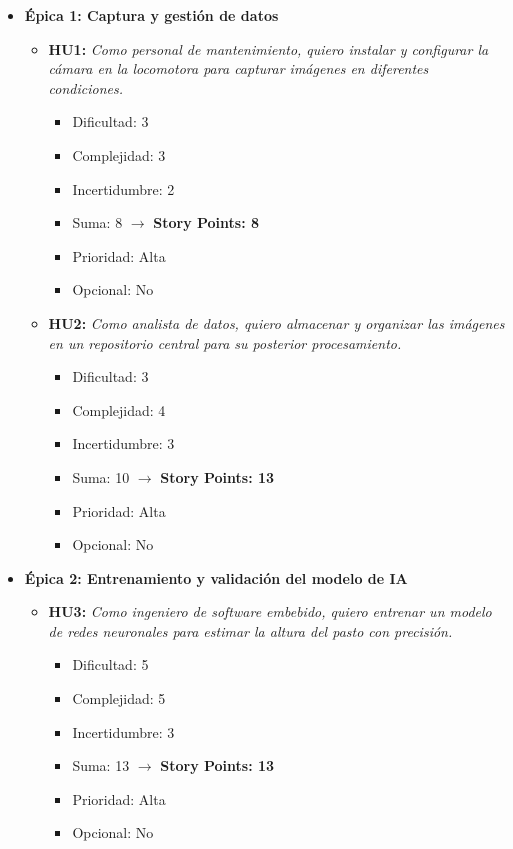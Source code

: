 \documentclass[
11pt, %
]{ProyectoVpC}
\begin{document}
\begin{itemize}
  \item \textbf{\'{E}pica 1: Captura y gestión de datos}
    \begin{itemize}
      \item \textbf{HU1:} 
      \emph{Como personal de mantenimiento, quiero instalar y configurar la cámara en la locomotora para capturar imágenes en diferentes condiciones.}
        \begin{itemize}[label=$\cdot$]
          \item Dificultad: 3
          \item Complejidad: 3
          \item Incertidumbre: 2
          \item Suma: 8 $\rightarrow$ \textbf{Story Points: 8}
          \item Prioridad: Alta
          \item Opcional: No
        \end{itemize}

      \item \textbf{HU2:} 
      \emph{Como analista de datos, quiero almacenar y organizar las imágenes en un repositorio central para su posterior procesamiento.}
        \begin{itemize}[label=$\cdot$]
          \item Dificultad: 3
          \item Complejidad: 4
          \item Incertidumbre: 3
          \item Suma: 10 $\rightarrow$ \textbf{Story Points: 13}
          \item Prioridad: Alta
          \item Opcional: No
        \end{itemize}
    \end{itemize}

  \item \textbf{\'{E}pica 2: Entrenamiento y validación del modelo de IA}
    \begin{itemize}
      \item \textbf{HU3:}
      \emph{Como ingeniero de software embebido, quiero entrenar un modelo de redes neuronales para estimar la altura del pasto con precisión.}
        \begin{itemize}[label=$\cdot$]
          \item Dificultad: 5
          \item Complejidad: 5
          \item Incertidumbre: 3
          \item Suma: 13 $\rightarrow$ \textbf{Story Points: 13}
          \item Prioridad: Alta
          \item Opcional: No
        \end{itemize}


\end{itemize}
\end{itemize}
\end{document}
